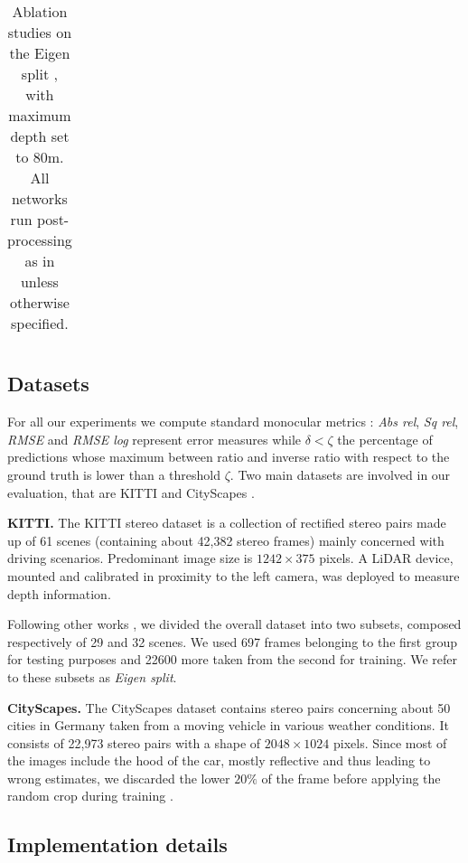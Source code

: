 \documentclass[10pt,twocolumn,letterpaper]{article}
\begin{document}
\begin{table*}[!h]
{\begin{tabular}{lccc|cccc|ccc}
\hline

\end{tabular}
}
\smallskip
\caption{Ablation studies on the Eigen split \cite{eigen2014depth}, with maximum depth set to 80m. All networks run post-processing as in \cite{monodepth17} unless otherwise specified.}
\label{tab:comparison_monodepth}
\end{table*}



 
\subsection{Datasets}

For all our experiments we compute standard monocular metrics \cite{eigen2014depth,monodepth17}: \textit{Abs rel}, \textit{Sq rel}, \textit{RMSE} and \textit{RMSE log} represent error measures while $\delta < \zeta$ the percentage of predictions whose maximum between ratio and inverse ratio with respect to the ground truth is lower than a threshold $\zeta$. Two main datasets are involved in our evaluation, that are KITTI \cite{KITTI_RAW} and CityScapes \cite{cordts2016cityscapes}.

\textbf{KITTI.}
The KITTI stereo dataset \cite{KITTI_RAW} is a collection of rectified stereo pairs made up of 61 scenes (containing about 42,382 stereo frames) mainly concerned with driving scenarios. Predominant image size is $1242 \times 375$ pixels. A LiDAR device, mounted and calibrated in proximity to the left camera, was deployed to measure depth information.

Following other works \cite{eigen2014depth, monodepth17}, we divided the overall dataset into two subsets, composed respectively of 29 and 32 scenes. We used 697 frames belonging to the first group for testing purposes and 22600 more taken from the second for training. We refer to these subsets as \textit{Eigen split}.

\textbf{CityScapes.}
The CityScapes dataset \cite{cordts2016cityscapes} contains stereo pairs concerning about 50 cities in Germany taken from a moving vehicle in various weather conditions. It consists of 22,973 stereo pairs with a shape of $2048 \times 1024$ pixels. Since most of the images include the hood of the car, mostly reflective and thus leading to wrong estimates, we discarded the lower $20\%$ of the frame before applying the random crop during training \cite{monodepth17}.   



\subsection{Implementation details}
\end{document}
